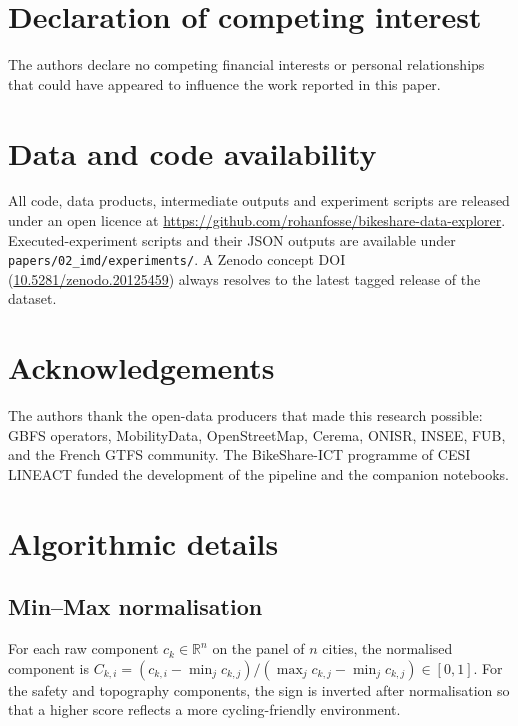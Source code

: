 \documentclass[11pt,a4paper]{article}
\begin{document}
\section*{Declaration of competing interest}

The authors declare no competing financial interests or personal
relationships that could have appeared to influence the work
reported in this paper.

\section*{Data and code availability}

All code, data products, intermediate outputs and experiment
scripts are released under an open licence at
\url{https://github.com/rohanfosse/bikeshare-data-explorer}.
Executed-experiment scripts and their JSON outputs are
available under
\texttt{papers/02\_imd/experiments/}. A Zenodo concept DOI
(\href{https://doi.org/10.5281/zenodo.20125459}%
{10.5281/zenodo.20125459}) always resolves to the latest tagged
release of the dataset.

\section*{Acknowledgements}

The authors thank the open-data producers that made this research
possible: GBFS operators, MobilityData, OpenStreetMap, Cerema,
ONISR, INSEE, FUB, and the French GTFS community. The
BikeShare-ICT programme of CESI LINEACT funded the development of
the pipeline and the companion notebooks.

\appendix

\section{Algorithmic details}
\label{app:algo}

\subsection{Min--Max normalisation}

For each raw component $c_k \in \mathbb{R}^{n}$ on the panel of
$n$ cities, the normalised component is
$C_{k,i} = (c_{k,i} - \min_j c_{k,j}) /
            (\max_j c_{k,j} - \min_j c_{k,j}) \in [0, 1]$.
For the safety and topography components, the sign is inverted
after normalisation so that a higher score reflects a more
cycling-friendly environment.
\end{document}
